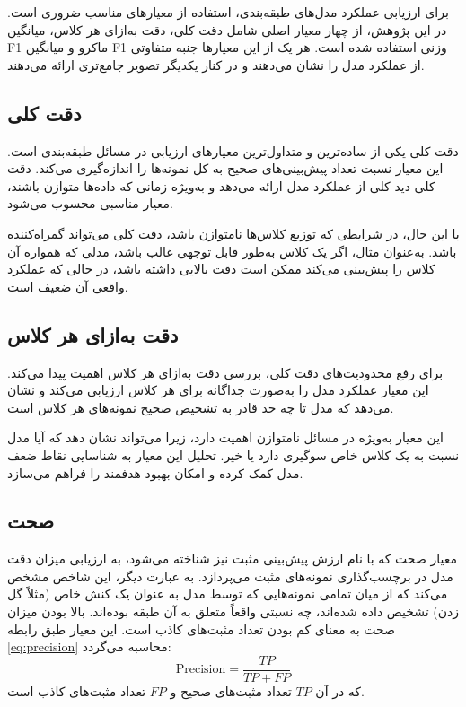 \documentclass[12pt]{report}
\begin{document}
برای ارزیابی عملکرد مدل‌های طبقه‌بندی، استفاده از معیارهای مناسب ضروری است. در این پژوهش، از چهار معیار اصلی شامل دقت کلی، دقت به‌ازای هر کلاس، میانگین F1 ماکرو و میانگین F1 وزنی استفاده شده است. هر یک از این معیارها جنبه متفاوتی از عملکرد مدل را نشان می‌دهند و در کنار یکدیگر تصویر جامع‌تری ارائه می‌دهند.

\subsection[دقت کلی]{دقت کلی}
دقت کلی یکی از ساده‌ترین و متداول‌ترین معیارهای ارزیابی در مسائل طبقه‌بندی است. این معیار نسبت تعداد پیش‌بینی‌های صحیح به کل نمونه‌ها را اندازه‌گیری می‌کند. دقت کلی دید کلی از عملکرد مدل ارائه می‌دهد و به‌ویژه زمانی که داده‌ها متوازن باشند، معیار مناسبی محسوب می‌شود.

با این حال، در شرایطی که توزیع کلاس‌ها نامتوازن باشد، دقت کلی می‌تواند گمراه‌کننده باشد. به‌عنوان مثال، اگر یک کلاس به‌طور قابل توجهی غالب باشد، مدلی که همواره آن کلاس را پیش‌بینی می‌کند ممکن است دقت بالایی داشته باشد، در حالی که عملکرد واقعی آن ضعیف است.

\subsection[دقت به‌ازای هر کلاس]{دقت به‌ازای هر کلاس}
برای رفع محدودیت‌های دقت کلی، بررسی دقت به‌ازای هر کلاس اهمیت پیدا می‌کند. این معیار عملکرد مدل را به‌صورت جداگانه برای هر کلاس ارزیابی می‌کند و نشان می‌دهد که مدل تا چه حد قادر به تشخیص صحیح نمونه‌های هر کلاس است.

این معیار به‌ویژه در مسائل نامتوازن اهمیت دارد، زیرا می‌تواند نشان دهد که آیا مدل نسبت به یک کلاس خاص سوگیری دارد یا خیر. تحلیل این معیار به شناسایی نقاط ضعف مدل کمک کرده و امکان بهبود هدفمند را فراهم می‌سازد.

\subsection[صحت]{صحت}
معیار صحت که با نام ارزش پیش‌بینی مثبت نیز شناخته می‌شود، به ارزیابی میزان دقت مدل در برچسب‌گذاری نمونه‌های مثبت می‌پردازد. به عبارت دیگر، این شاخص مشخص می‌کند که از میان تمامی نمونه‌هایی که توسط مدل به عنوان یک کنش خاص (مثلاً گل زدن) تشخیص داده شده‌اند، چه نسبتی واقعاً متعلق به آن طبقه بوده‌اند. بالا بودن میزان صحت به معنای کم بودن تعداد مثبت‌های کاذب است. این معیار طبق رابطه \ref{eq:precision} محاسبه می‌گردد:
\begin{equation}\label{eq:precision}
\text{Precision} = \frac{TP}{TP + FP}
\end{equation}
که در آن $TP$ تعداد مثبت‌های صحیح و $FP$ تعداد مثبت‌های کاذب است.
\end{document}
